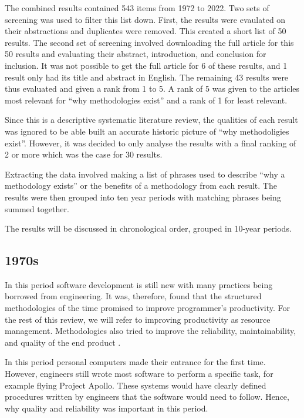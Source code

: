 The combined results contained 543  items from 1972 to 2022.
Two sets of screening was used to filter this list down.
First, the results were evaulated on their abstractions and duplicates were removed.
This created a short list of 50 results.
The second set of screening involved downloading the full article for this 50 results and evaluating their abstract, introduction, and conclusion for inclusion.
It was not possible to get the full article for 6 of these results, and 1 result only had its title and abstract in English.
The remaining 43 results were thus evaluated and given a rank from 1 to 5.
A rank of 5 was given to the articles most relevant for ``why methodologies exist'' and a rank of 1 for least relevant.

Since this is a descriptive systematic literature review, the qualities of each result was ignored to be able built an accurate historic picture of ``why methodoligies exist''.
However, it was decided to only analyse the results with a final ranking of 2 or more which was the case for 30 results.

Extracting the data involved making a list of phrases used to describe ``why a methodology exists'' or the benefits of a methodology from each result.
The results were then grouped into ten year periods with matching phrases being summed together.


The results will be discussed in chronological order, grouped in 10-year periods. 

\subsection{1970s}
In this period software development is still new with many practices being borrowed from engineering.
It was, therefore, found that the structured methodologies of the time promised to improve programmer's productivity.
For the rest of this review, we will refer to improving productivity as resource management.
Methodologies also tried to improve the reliability, maintainability, and quality of the end product \cite{yourdon_1977}.

In this period personal computers made their entrance for the first time.
However, engineers still wrote most software to perform a specific task, for example flying Project Apollo.
These systems would have clearly defined procedures written by engineers that the software would need to follow.
Hence, why quality and reliability was important in this period.

